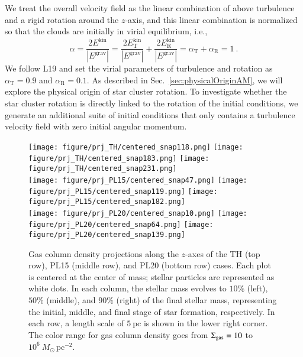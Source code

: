 \documentclass[fleqn,usenatbib]{mnras}
\begin{document}
We treat the overall velocity field as the linear combination of above turbulence and a rigid rotation around the $z$-axis, and this linear combination is normalized so that the clouds are initially in virial equilibrium, i.e.,
\begin{equation}
    \alpha=\frac{2E^{\mathrm{kin}}}{|E^{\mathrm{grav}}|}=\frac{2E_\mathrm{T}^{\mathrm{kin}}}{|E^{\mathrm{grav}}|}+\frac{2E_\mathrm{R}^{\mathrm{kin}}}{|E^{\mathrm{grav}}|}=\alpha_{\mathrm{T}}+\alpha_{\mathrm{R}}=1\:.
    \label{eq:virialEquilibrium}
\end{equation}
We follow L19 and set the virial parameters of turbulence and rotation as $\alpha_{\mathrm{T}}=0.9$ and $\alpha_{\mathrm{R}}=0.1$. 
As described in Sec.~\ref{sec:physicalOriginAM}, we will explore the physical origin of star cluster rotation.
To investigate whether the star cluster rotation is directly linked to the rotation of the initial conditions, we generate an additional suite of initial conditions that only contains a turbulence velocity field with zero initial angular momentum.

\begin{figure*}
	\texttt{[image: figure/prj\_TH/centered\_snap118.png]}
	\hspace{0.001\columnwidth}
	\texttt{[image: figure/prj\_TH/centered\_snap183.png]}
	\hspace{0.001\columnwidth}
	\texttt{[image: figure/prj\_TH/centered\_snap231.png]}
	\vspace{0.01\columnwidth} \\
	\texttt{[image: figure/prj\_PL15/centered\_snap47.png]}
	\hspace{0.001\columnwidth}
	\texttt{[image: figure/prj\_PL15/centered\_snap119.png]}
	\hspace{0.001\columnwidth}
	\texttt{[image: figure/prj\_PL15/centered\_snap182.png]}
	\vspace{0.01\columnwidth} \\
	\texttt{[image: figure/prj\_PL20/centered\_snap10.png]}
	\hspace{0.001\columnwidth}
	\texttt{[image: figure/prj\_PL20/centered\_snap64.png]}
	\hspace{0.001\columnwidth}
	\texttt{[image: figure/prj\_PL20/centered\_snap139.png]}
	\vspace{0.02\columnwidth}
	\caption{Gas column density projections along the $z$-axes of the TH (top row), PL15 (middle row), and PL20 (bottom row) cases. Each plot is centered at the center of mass; stellar particles are represented as white dots. In each column, the stellar mass evolves to $10\%$ (left), $50\%$ (middle), and $90\%$ (right) of the final stellar mass, representing the initial, middle, and final stage of star formation, respectively. In each row, a length scale of $5\ \mathrm{pc}$ is shown in the lower right corner. The color range for gas column density goes from $\Sigma_{\rm gas}=10$ to $10^6\ M_{\odot}\,\mathrm{pc}^{-2}$.}
	\label{fig:prj}
\end{figure*}
\end{document}
